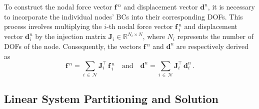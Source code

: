 To construct the nodal force vector $\mathbf{f}{\,}^{n}$ and displacement vector $\mathbf{d}^{n}$, it is necessary to incorporate the individual nodes' \acp{BC} into their corresponding \acp{DOF}. This process involves multiplying the $i$-th nodal force vector $\mathbf{f}{\,}^{n}_{i}$ and displacement vector $\mathbf{d}^{n}_{i}$ by the injection matrix $\mathbf{J}_{i} \in \mathbb{R}^{N_i \times N}$, where $N_i$ represents the number of \acp{DOF} of the node. Consequently, the vectors $\mathbf{f}{\,}^{n}$ and $\mathbf{d}^{n}$ are respectively derived as
%
\begin{equation*}
  \mathbf{f}{\,}^{n} = \sum_{i \, \in \, \mathcal{N}} \mathbf{J}_{i}^\top \, \mathbf{f}{\,}^{n}_{i}
  \quad \text{and} \quad
  \mathbf{d}^{n} = \sum_{i \, \in \, \mathcal{N}} \mathbf{J}_{i}^\top \, \mathbf{d}^{n}_{i} \, \text{.}
\end{equation*}

\subsection{Linear System Partitioning and Solution}


